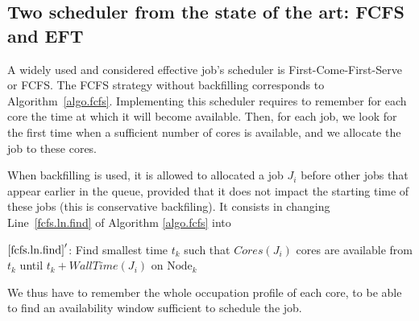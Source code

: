 \documentclass[conference,10pt]{IEEEtran}
\newcommand{\Node}[1]{\ensuremath{\mathrm{Node}_{#1}}\xspace}
\newcommand{\core}{\mathit{Cores}\xspace}
\newcommand{\walltime}{\mathit{WallTime}\xspace}
\begin{document}




\subsection{Two scheduler from the state of the art: FCFS and EFT}\label{subsec.fcfs_eft}

A widely used and considered effective job's scheduler is
First-Come-First-Serve or FCFS. The FCFS strategy without backfilling
corresponds to Algorithm~\ref{algo.fcfs}. Implementing this scheduler
requires to remember for each core the time at which it will become
available. Then, for each job, we look for the first time when a
sufficient number of cores is available, and we allocate the job to
these cores.

When backfilling is used, it is allowed to allocated a job $J_i$
before other jobs that appear earlier in the queue, provided that it
does not impact the starting time of these jobs (this is conservative
backfiling). It consists in changing Line~\ref{fcfs.ln.find} of
Algorithm \ref{algo.fcfs} into
\begin{algorithmic}[0]
  \State $\ref{fcfs.ln.find}'$: Find smallest time $t_k$ such that $\core(J_i)$ cores are
  available from $t_k$ until $t_k + \walltime(J_i)$ on $\Node{k}$
\end{algorithmic}
We thus have to remember the whole occupation profile of each core, to
be able to find an availability window sufficient to schedule the job.
\end{document}
